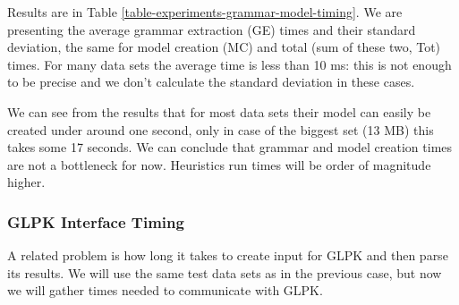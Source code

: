 Results are in Table \ref{table-experiments-grammar-model-timing}. We are presenting the average grammar extraction (GE) times and their standard deviation, the same for model creation (MC) and total (sum of these two, Tot) times. For many data sets the average time is less than 10 ms: this is not enough to be precise and we don't calculate the standard deviation in these cases.

We can see from the results that for most data sets their model can easily be created under around one second, only in case of the biggest set  (13 MB) this takes some 17 seconds. We can conclude that grammar and model creation times are not a bottleneck for now. Heuristics run times will be order of magnitude higher.

\subsubsection{GLPK Interface Timing}


A related problem is how long it takes to create input for GLPK and then parse its results. We will use the same test data sets as in the previous case, but now we will gather times needed to communicate with GLPK.\\

